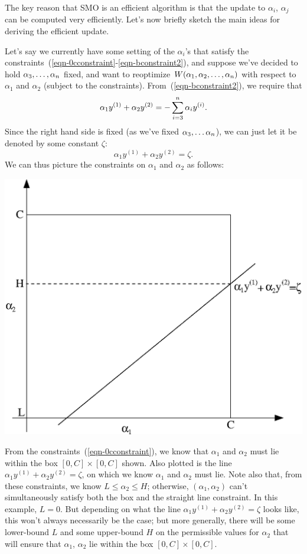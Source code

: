 \documentclass{article}
\begin{document}
The key reason that SMO is an efficient algorithm is that the update
to $\alpha_i$, $\alpha_j$ can be computed very efficiently.
Let's now briefly sketch the main ideas for deriving the efficient update.

Let's say we currently have some setting of the $\alpha_i$'s that satisfy the
constraints~(\ref{eqn-0cconstraint}-\ref{eqn-bconstraint2}), and suppose we've
decided to hold $\alpha_3, \ldots, \alpha_{{n}}$ fixed, and want to reoptimize
$W(\alpha_1, \alpha_2, \ldots, \alpha_{{n}})$ with respect to $\alpha_1$ and $\alpha_2$ (subject
to the constraints).  From~(\ref{eqn-bconstraint2}), we require that
\[
\alpha_1 y^{(1)} + \alpha_2 y^{(2)} = - \sum_{i=3}^{n} \alpha_i y^{(i)}.
\]
Since the right hand side is fixed (as we've fixed $\alpha_3, \ldots \alpha_{{n}}$), we
can just let it be denoted by some constant $\zeta$:
\begin{equation}
\alpha_1 y^{(1)} + \alpha_2 y^{(2)} = \zeta.		\label{eqn-alpha1}
\end{equation}
We can thus picture the constraints on $\alpha_1$ and $\alpha_2$ as follows:
\begin{center}
\includegraphics[scale=0.5]{alphaConstraints.eps}
\end{center}
From the constraints~(\ref{eqn-0cconstraint}), we know that $\alpha_1$ and $\alpha_2$ must
lie within the box $[0,C]\times [0,C]$ shown.  Also plotted is the line
$\alpha_1 y^{(1)} + \alpha_2 y^{(2)} = \zeta$, on which we know
$\alpha_1$ and $\alpha_2$ must lie.  Note also that, from these constraints,
we know $L \leq \alpha_2 \leq H$; otherwise, $(\alpha_1, \alpha_2)$ can't simultaneously
satisfy both the box and the straight line constraint.  In this example, $L=0$. But depending on
what the line $\alpha_1 y^{(1)} + \alpha_2 y^{(2)} = \zeta$ looks like,
this won't always necessarily be the case; but more generally, there will be
some lower-bound $L$ and some upper-bound $H$ on the permissible
values for $\alpha_2$ that will ensure that $\alpha_1$, $\alpha_2$ lie
within the box $[0,C] \times [0,C]$.
\end{document}
